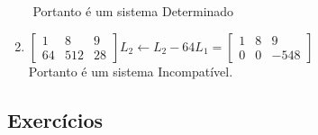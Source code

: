 \begin{resol}
\begin{enumerate}
\begin{math}
                \end{math}
        Portanto é um sistema Determinado
            \item\begin{math}
                \begin{bmatrix}
                    1 & 8 & 9 \\
                    64 & 512 & 28
                \end{bmatrix}
                    L_{2} \leftarrow L_{2} - 64L_{1}
                    =
                \begin{bmatrix}
                    1 & 8 & 9 \\
                    0 & 0 & -548
                \end{bmatrix}
                \end{math} \\
        Portanto é um sistema Incompatível.
        \end{enumerate}
 \end{resol}

\subsection*{Exercícios}

\construirExer

